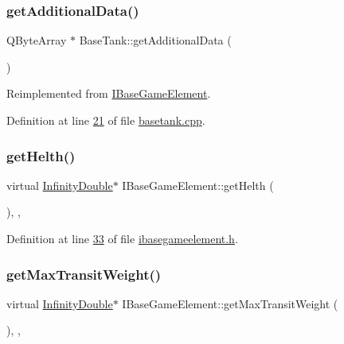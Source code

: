\subsubsection{\texorpdfstring{get\+Additional\+Data()}{getAdditionalData()}}
{\footnotesize\ttfamily Q\+Byte\+Array $\ast$ Base\+Tank\+::get\+Additional\+Data (\begin{DoxyParamCaption}{ }\end{DoxyParamCaption})\hspace{0.3cm}{\ttfamily [virtual]}}



Reimplemented from \hyperlink{a00137_aaf3cdf5f4e893704c9f17c524a1f0a8c}{I\+Base\+Game\+Element}.



Definition at line \hyperlink{a00038_source_l00021}{21} of file \hyperlink{a00038_source}{basetank.\+cpp}.

\mbox{\label{a00137_a13a00e39ece3e20e3f5e049224da8d40}} 
\subsubsection{\texorpdfstring{get\+Helth()}{getHelth()}}
{\footnotesize\ttfamily virtual \hyperlink{a00161}{Infinity\+Double}$\ast$ I\+Base\+Game\+Element\+::get\+Helth (\begin{DoxyParamCaption}{ }\end{DoxyParamCaption})\hspace{0.3cm}{\ttfamily [inline]}, {\ttfamily [virtual]}, {\ttfamily [inherited]}}



Definition at line \hyperlink{a00047_source_l00033}{33} of file \hyperlink{a00047_source}{ibasegameelement.\+h}.

\mbox{\label{a00137_a4c74c903e19ada9da9150cf9569b4e9d}} 
\subsubsection{\texorpdfstring{get\+Max\+Transit\+Weight()}{getMaxTransitWeight()}}
{\footnotesize\ttfamily virtual \hyperlink{a00161}{Infinity\+Double}$\ast$ I\+Base\+Game\+Element\+::get\+Max\+Transit\+Weight (\begin{DoxyParamCaption}{ }\end{DoxyParamCaption})\hspace{0.3cm}{\ttfamily [inline]}, {\ttfamily [virtual]}, {\ttfamily [inherited]}}



